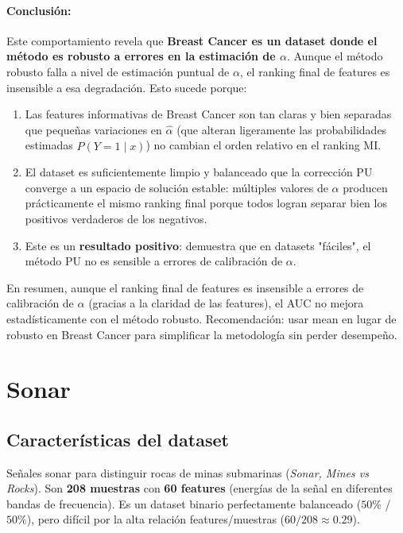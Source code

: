 \documentclass[a4paper,11pt]{article}
\begin{document}
\paragraph{Conclusión:} Este comportamiento revela que \textbf{Breast Cancer es un dataset donde el método es robusto a errores en la estimación de $\alpha$}. Aunque el método robusto falla a nivel de estimación puntual de $\alpha$, el ranking final de features es insensible a esa degradación. Esto sucede porque:

\begin{enumerate}
    \item Las features informativas de Breast Cancer son tan claras y bien separadas que pequeñas variaciones en $\hat{\alpha}$ (que alteran ligeramente las probabilidades estimadas $\hat{P}(Y=1 \mid x)$) no cambian el orden relativo en el ranking MI.
    \item El dataset es suficientemente limpio y balanceado que la corrección PU converge a un espacio de solución estable: múltiples valores de $\alpha$ producen prácticamente el mismo ranking final porque todos logran separar bien los positivos verdaderos de los negativos.
    \item Este es un \textbf{resultado positivo}: demuestra que en datasets "fáciles", el método PU no es sensible a errores de calibración de $\alpha$.
\end{enumerate}

En resumen, aunque el ranking final de features es insensible a errores de calibración de $\alpha$ (gracias a la claridad de las features), el AUC no mejora estadísticamente con el método robusto. Recomendación: usar mean en lugar de robusto en Breast Cancer para simplificar la metodología sin perder desempeño.


\section{Sonar}

\subsection{Características del dataset}

Señales sonar para distinguir rocas de minas submarinas (\textit{Sonar, Mines vs Rocks}). Son \textbf{208 muestras} con \textbf{60 features} (energías de la señal en diferentes bandas de frecuencia). Es un dataset binario perfectamente balanceado ($50\%$ / $50\%$), pero difícil por la alta relación features/muestras ($60/208 \approx 0.29$).
\end{document}
